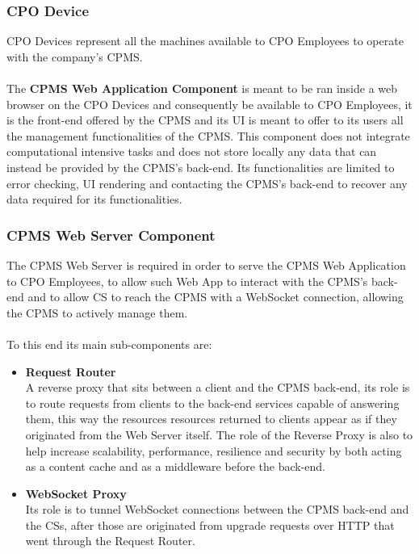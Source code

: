 \documentclass[11pt]{article}
\begin{document}
\subsubsection{CPO Device}

CPO Devices represent all the machines available to CPO Employees to operate with the company's CPMS. \\
\\
The \textbf{CPMS Web Application Component} is meant to be ran inside a web browser on the CPO Devices and consequently be available to CPO Employees, it is the front-end offered by the CPMS and its UI is meant to offer to its users all the management functionalities of the CPMS. This component does not integrate computational intensive tasks and does not store locally any data that can instead be provided by the CPMS's back-end. Its functionalities are limited to error checking, UI rendering and contacting the CPMS's back-end to recover any data required for its functionalities.

\subsubsection{CPMS Web Server Component}

The CPMS Web Server is required in order to serve the CPMS Web Application to CPO Employees, to allow such Web App to interact with the CPMS's back-end and to allow CS to reach the CPMS with a WebSocket connection, allowing the CPMS to actively manage them. \\
\\
To this end its main sub-components are:

\begin{itemize}
    \item \textbf{Request Router} \\
        A reverse proxy that sits between a client and the CPMS back-end, its role is to route requests from clients to the back-end services capable of answering them, this way the resources resources returned to clients appear as if they originated from the Web Server itself. The role of the Reverse Proxy is also to help increase scalability, performance, resilience and security by both acting as a content cache and as a middleware before the back-end.
    \item \textbf{WebSocket Proxy} \\
        Its role is to tunnel WebSocket connections between the CPMS back-end and the CSs, after those are originated from upgrade requests over HTTP that went through the Request Router.
\end{itemize}
\end{document}
